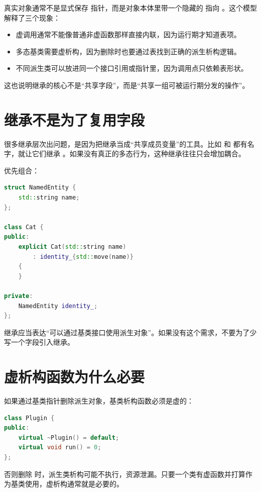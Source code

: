 真实对象通常不是显式保存  指针，而是对象本体里带一个隐藏的  指向 。这个模型解释了三个现象：

\begin{itemize}
  \item 虚调用通常不能像普通非虚函数那样直接内联，因为运行期才知道表项。
  \item 多态基类需要虚析构，因为删除时也要通过表找到正确的派生析构逻辑。
  \item 不同派生类可以放进同一个接口引用或指针里，因为调用点只依赖表形状。
\end{itemize}

这也说明继承的核心不是“共享字段”，而是“共享一组可被运行期分发的操作”。

\section{继承不是为了复用字段}

很多继承层次出问题，是因为把继承当成“共享成员变量”的工具。比如  和  都有名字，就让它们继承 。如果没有真正的多态行为，这种继承往往只会增加耦合。

优先组合：

\begin{lstlisting}[language=C++,caption={组合共享数据}]
struct NamedEntity {
    std::string name;
};

class Cat {
public:
    explicit Cat(std::string name)
        : identity_{std::move(name)}
    {
    }

private:
    NamedEntity identity_;
};
\end{lstlisting}

继承应当表达“可以通过基类接口使用派生对象”。如果没有这个需求，不要为了少写一个字段引入继承。

\section{虚析构函数为什么必要}

如果通过基类指针删除派生对象，基类析构函数必须是虚的：

\begin{lstlisting}[language=C++,caption={多态基类需要虚析构}]
class Plugin {
public:
    virtual ~Plugin() = default;
    virtual void run() = 0;
};
\end{lstlisting}

否则删除  时，派生类析构可能不执行，资源泄漏。只要一个类有虚函数并打算作为基类使用，虚析构通常就是必要的。

